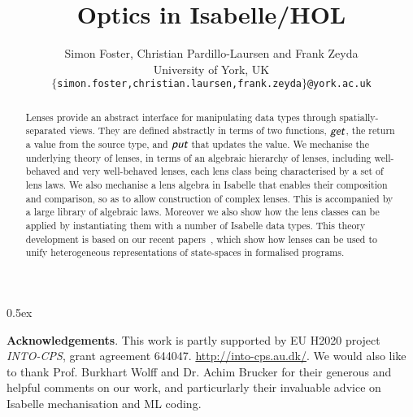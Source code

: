 \documentclass[11pt,a4paper]{article}
\newcommand{\lput}{\textit{\textsf{put}}}
\newcommand{\lget}{\textit{\textsf{get}}}
\begin{document}
\title{Optics in Isabelle/HOL}

\author{Simon Foster, Christian Pardillo-Laursen and Frank Zeyda \\[.5ex] University of York, UK \\[2ex] \texttt{\small $\{$simon.foster,christian.laursen,frank.zeyda$\}$@york.ac.uk}}

\maketitle

\begin{abstract}
  Lenses provide an abstract interface for manipulating data types through spatially-separated views. They are defined
  abstractly in terms of two functions, $\lget$, the return a value from the source type, and $\lput$ that updates
  the value. We mechanise the underlying theory of lenses, in terms of an algebraic hierarchy of lenses, including
  well-behaved and very well-behaved lenses, each lens class being characterised by a set of lens laws. We also mechanise 
  a lens algebra in Isabelle that enables their composition and comparison, so as to allow construction of complex lenses.
  This is accompanied by a large library of algebraic laws. Moreover we also show how the lens classes can be applied by 
  instantiating them with a number of Isabelle data types. This theory development is based on our recent 
  papers~\cite{Foster16a,Foster2020-IsabelleUTP}, which show how lenses can be used to unify heterogeneous representations 
  of state-spaces in formalised programs.
\end{abstract}

\tableofcontents

\parindent 0pt\parskip 0.5ex



\vspace{4ex}

\noindent\textbf{Acknowledgements}. This work is partly supported by EU H2020 project \emph{INTO-CPS}, grant agreement
644047. \url{http://into-cps.au.dk/}. We would also like to thank Prof. Burkhart Wolff and Dr. Achim Brucker
for their generous and helpful comments on our work, and particurlarly their invaluable advice on Isabelle
mechanisation and ML coding.



\end{document}
